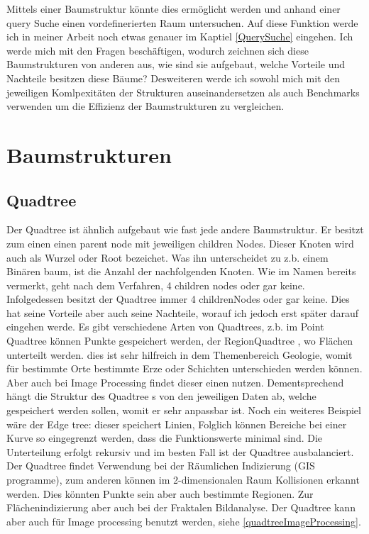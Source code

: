\documentclass[11pt]{article}
\newcommand{\qt}{Quadtree }
\begin{document}
Mittels einer Baumstruktur könnte dies ermöglicht werden und anhand einer query Suche einen vordefinerierten Raum untersuchen. Auf diese Funktion werde ich in meiner Arbeit noch etwas genauer im Kaptiel \ref{QuerySuche} eingehen.\newline
Ich werde mich mit den Fragen beschäftigen, wodurch zeichnen sich diese Baumstrukturen von anderen aus, wie sind sie aufgebaut, welche Vorteile und Nachteile besitzen diese Bäume? 
Desweiteren werde ich sowohl mich mit den jeweiligen Komlpexitäten der Strukturen auseinandersetzen als auch Benchmarks verwenden um die Effizienz der Baumstrukturen zu vergleichen.  

\pagebreak
\section{Baumstrukturen} \label{TreeStructures}

\subsection{\qt} \label{Quadtree}

Der \qt ist ähnlich aufgebaut wie fast jede andere Baumstruktur. Er besitzt zum einen einen parent node mit jeweiligen children Nodes.
Dieser Knoten wird auch als Wurzel oder Root bezeichet. Was ihn unterscheidet zu z.b. einem Binären baum, ist die Anzahl der nachfolgenden Knoten.
Wie im Namen bereits vermerkt, geht nach dem Verfahren, 4 children nodes oder gar keine. Infolgedessen besitzt der \qt immer 4 childrenNodes oder gar keine. Dies hat seine Vorteile aber auch seine Nachteile, worauf ich jedoch erst später darauf eingehen werde. 
\newline
Es gibt verschiedene Arten von Quadtrees, z.b. im Point Quadtree können Punkte gespeichert werden, der Region\qt , wo Flächen unterteilt werden. dies ist sehr hilfreich in dem Themenbereich Geologie, womit für bestimmte Orte bestimmte Erze oder Schichten unterschieden werden können.
Aber auch bei Image Processing findet dieser einen nutzen. Dementsprechend hängt die Struktur des \qt s von den jeweiligen Daten ab, welche gespeichert werden sollen, womit er sehr anpassbar ist.   
Noch ein weiteres Beispiel wäre der Edge tree: dieser speichert Linien, Folglich können Bereiche bei einer Kurve so eingegrenzt werden, dass die Funktionswerte minimal sind.  
\newline
Die Unterteilung erfolgt rekursiv und im besten Fall ist der \qt ausbalanciert. 
\newline
Der \qt findet Verwendung bei der Räumlichen Indizierung (GIS programme), zum anderen können im 2-dimensionalen Raum Kollisionen erkannt werden. Dies könnten Punkte sein aber auch bestimmte Regionen. Zur Flächenindizierung aber auch bei der Fraktalen Bildanalyse. 
\newline
Der \qt kann aber auch für Image processing benutzt werden, siehe \ref{quadtreeImageProcessing}. 
\end{document}
